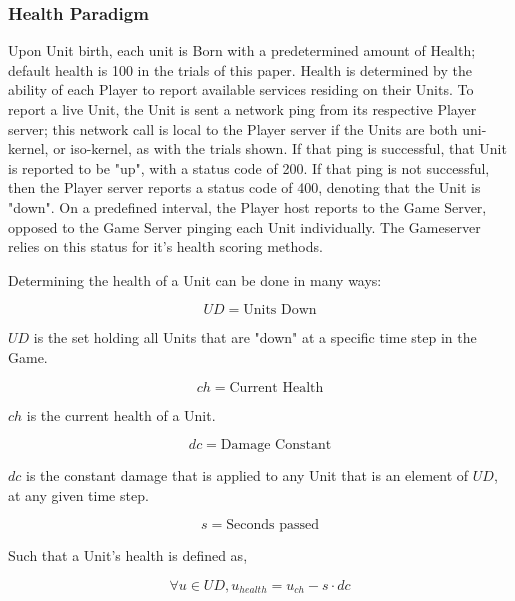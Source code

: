 \documentclass[10pt, titlepage, twocolumn]{article}
\newcommand{\ii}{\indent\indent}
\begin{document}
\subsubsection{Health Paradigm}
\ii
Upon Unit birth, each unit is Born with a predetermined amount of Health; default health is 100 in the trials of this paper. Health is determined by the ability of each Player to report available services residing on their Units. To report a live Unit, the Unit is sent a network ping from its respective Player server; this network call is local to the Player server if the Units are both uni-kernel, or iso-kernel, as with the trials shown. If that ping is successful, that Unit is reported to be "up", with a status code of 200. If that ping is not successful, then the Player server reports a status code of 400, denoting that the Unit is "down". On a predefined interval, the Player host reports to the Game Server, opposed to the Game Server pinging each Unit individually. The Gameserver relies on this status for it's health scoring methods.

Determining the health of a Unit can be done in many ways:

\begin{equation}
UD = \text{Units Down}
\end{equation}

\noindent
\(UD\) is the set holding all Units that are "down" at a specific time step in the Game. 

\begin{equation}
ch = \text{Current Health}
\end{equation}

\noindent
\(ch\) is the current health of a Unit.

\begin{equation}
dc = \text{Damage Constant}
\end{equation}

\noindent
\(dc\) is the constant damage that is applied to any Unit that is an element of \(UD\), at any given time step.

\begin{equation}
s = \text{Seconds passed}
\end{equation}

\noindent
Such that a Unit's health is defined as,

\begin{equation}\label{healthexplaination}
\forall u \in UD, u_{health} = u_{ch} - s \cdot dc
\end{equation}
\end{document}
